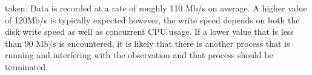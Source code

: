 \documentclass[a4paper,12pt]{article}
\begin{document}
taken. Data is recorded at a rate of roughly 110 Mb/s on average. A higher value of 120Mb/s is typically expected however, the write speed depends on both the disk write speed as well as concurrent CPU usage. If a lower value that is less than 90 Mb/s is encountered, it is likely that there is another process that is running and interfering with the observation and that process should be terminated.


                                                                                                                                                                                                                                                                                                                                                                                                                                                                                                                                                                                                                                                                                                                                                                                                                                                                                                                                                                                                                                                                                                                                                                                                                                                                                                                                                                                                                                                                                                                                                                                                                                                                                                                                                                                                                                                                                                                                                                                                                                                                                                                                                                                                                                                                                                                                                                                                                                                                                                                                                                                                                                                                                                                                                                                                                                                                                                                                               
\end{document}
